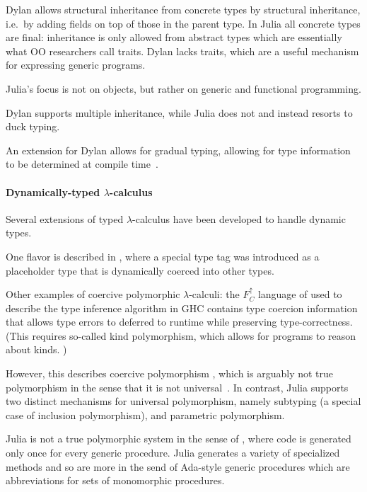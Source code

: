 Dylan allows structural inheritance from concrete types by structural inheritance, i.e.\ by adding fields on top of those in the parent type. In Julia all concrete types are final: inheritance is only allowed from abstract types which are essentially what OO researchers call traits. Dylan lacks traits, which are a useful mechanism for expressing generic programs.

Julia's focus is not on objects, but rather on generic and functional programming. 

Dylan supports multiple inheritance, while Julia does not and instead resorts to duck typing.

An extension for Dylan allows for gradual typing, allowing for type information to be determined at compile time~\cite{Mehnert2010}.

\paragraph{Dynamically-typed $\lambda$-calculus}

Several extensions of typed $\lambda$-calculus have been developed to handle dynamic types.

One flavor is described in \cite{Henglein, 1994}, where a special type tag 
was introduced as a placeholder type that is dynamically coerced into other
types. %

Other examples of coercive polymorphic $\lambda$-calculi: the $F^\uparrow_C$ language of \cite{Vytiniotis2012,Yorgey2012} used to describe the type inference algorithm in GHC \cite{Weirich2011} contains type coercion information that allows type errors to deferred to runtime \cite{Vytiniotis2012} while preserving type-correctness. (This requires so-called kind polymorphism, which allows for programs to reason about kinds. \cite{Yorgey2012})


However, this describes coercive polymorphism \cite{Cardelli1985}, which
is arguably not true polymorphism in the sense that it is not
universal~\cite{Strachey1967,Strachey2000}. In contrast, Julia supports two distinct
mechanisms for universal polymorphism, namely subtyping (a special case of
inclusion polymorphism), and parametric polymorphism.

Julia is not a true polymorphic system in the sense of \cite{Cardelli1985},
where code is generated only once for every generic procedure. Julia generates
a variety of specialized methods and so are more in the send of Ada-style
generic procedures which are abbreviations for sets of monomorphic procedures.

